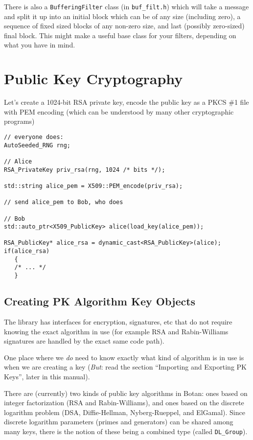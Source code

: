 \documentclass{article}
\newcommand{\filename}[1]{\texttt{#1}}
\newcommand{\type}[1]{\texttt{#1}}
\begin{document}
There is also a \type{BufferingFilter} class (in \filename{buf\_filt.h}) which
will take a message and split it up into an initial block which can be of any
size (including zero), a sequence of fixed sized blocks of any non-zero size,
and last (possibly zero-sized) final block. This might make a useful base class
for your filters, depending on what you have in mind.


\pagebreak
\section{Public Key Cryptography}

Let's create a 1024-bit RSA private key, encode the public key as a
PKCS \#1 file with PEM encoding (which can be understood by many other
cryptographic programs)

\begin{verbatim}
// everyone does:
AutoSeeded_RNG rng;

// Alice
RSA_PrivateKey priv_rsa(rng, 1024 /* bits */);

std::string alice_pem = X509::PEM_encode(priv_rsa);

// send alice_pem to Bob, who does

// Bob
std::auto_ptr<X509_PublicKey> alice(load_key(alice_pem));

RSA_PublicKey* alice_rsa = dynamic_cast<RSA_PublicKey>(alice);
if(alice_rsa)
   {
   /* ... */
   }

\end{verbatim}

\subsection{Creating PK Algorithm Key Objects}

The library has interfaces for encryption, signatures, etc that do not require
knowing the exact algorithm in use (for example RSA and Rabin-Williams
signatures are handled by the exact same code path).

One place where we \emph{do} need to know exactly what kind of algorithm is in
use is when we are creating a key (\emph{But}: read the section ``Importing and
Exporting PK Keys'', later in this manual).

There are (currently) two kinds of public key algorithms in Botan: ones based
on integer factorization (RSA and Rabin-Williams), and ones based on the
discrete logarithm problem (DSA, Diffie-Hellman, Nyberg-Rueppel, and
ElGamal). Since discrete logarithm parameters (primes and generators) can be
shared among many keys, there is the notion of these being a combined type
(called \type{DL\_Group}).
\end{document}

